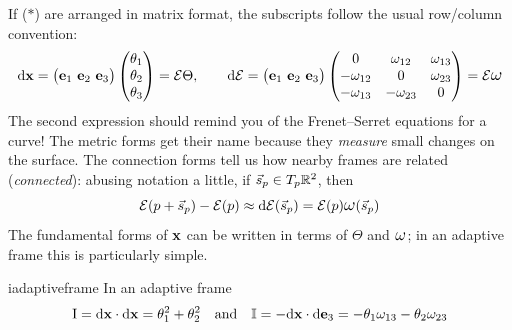 If ($\ast$) are arranged in matrix format, the subscripts follow the usual row/column convention:
\[
	\dvx=\bigl(\ve_1\ \ve_2\ \ve_3\bigr)\threevec{\theta_1}{\theta_2}{\theta_3}=\cE\Theta,\qquad \D \cE=\bigl(\ve_1\ \ve_2\ \ve_3\bigr)
	\begin{pmatrix}
		0&\omega_{12}&\omega_{13}\\
		-\omega_{12}&0&\omega_{23}\\
		-\omega_{13}&-\omega_{23}&0
	\end{pmatrix}
	=\cE\lomega
\]
The second expression should remind you of the Frenet--Serret equations for a curve! The metric forms get their name because they \emph{measure} small changes on the surface. The connection forms tell us how nearby frames are related (\emph{connected}): abusing notation a little, if $\vec s_p\in T_p\mathbb{R}^2$, then
\[\cE(p+\vec s_p)-\cE(p)\approx \D \cE(\vec s_p)=\cE(p)\lomega(\vec s_p)\]
The fundamental forms of ${\mathbf{x}}$ can be written in terms of $\Theta$ and $\lomega$; in an adaptive frame this is particularly simple.

\begin{lemm}{}{iadaptiveframe}
	In an adaptive frame
	\[
		\mathrm{I}=\mathrm{d}{\mathbf{x}}\cdot\mathrm{d}{\mathbf{x}}=\theta_1^2+\theta_2^2\quad\text{and}\quad \mathbb{I}=-\mathrm{d}{\mathbf{x}}\cdot\mathrm{d}{\mathbf{e}}_3=-\theta_1\omega_{13}-\theta_2\omega_{23}
	\]
\end{lemm}

